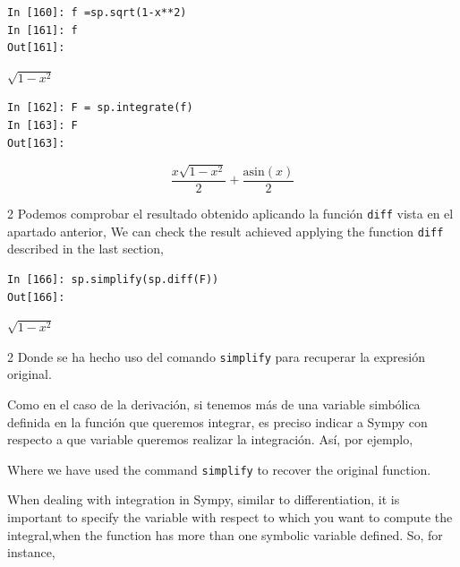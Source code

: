 \begin{center}
	\begin{minipage}{.5\textwidth}
		\begin{verbatim}
In [160]: f =sp.sqrt(1-x**2)
In [161]: f
Out[161]: 
			\end{verbatim}
		$\sqrt{1-x^2}$
		\begin{verbatim}
In [162]: F = sp.integrate(f)
In [163]: F
Out[163]: 
		\end{verbatim}
		\begin{equation*}
			\frac{x\sqrt{1-x^2}}{2}+\frac{\text{asin}(x)}{2}
		\end{equation*}
	\end{minipage}
\end{center}
\begin{paracol}{2}
Podemos comprobar el resultado obtenido aplicando la función \texttt{diff} vista en el apartado anterior,
\switchcolumn
We can check the result achieved applying the function \texttt{diff} described in the last section,
\end{paracol}
\begin{center}
	\begin{minipage}{.5\textwidth}
		\begin{verbatim}
In [166]: sp.simplify(sp.diff(F))
Out[166]:  
		\end{verbatim}
			$\sqrt{1-x^2}$
	\end{minipage}
\end{center}
\begin{paracol}{2}
Donde se ha hecho uso del comando \texttt{simplify} para recuperar la expresión original.

Como en el caso de la derivación, si tenemos más de una variable simbólica definida en la función que queremos integrar, es preciso indicar a Sympy con respecto a que variable queremos realizar la integración. Así, por ejemplo,

\switchcolumn
Where we have used the command \texttt{simplify} to recover the original function.

When dealing with integration in Sympy, similar to differentiation, it is important to specify the variable with respect to which you want to compute the integral,when the function has more than one symbolic variable defined. So, for instance,
\end{paracol}
